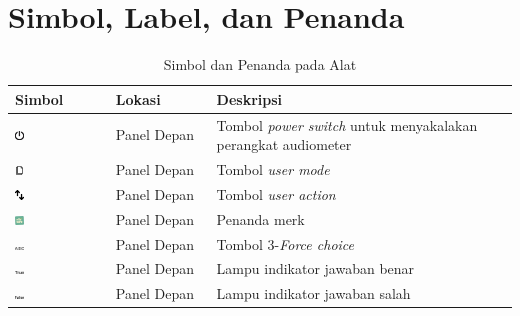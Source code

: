 \documentclass[11pt,a4paper,twoside,onecolumn]{book}
\begin{document}
		\section{Simbol, Label, dan Penanda}
		\begin{table}
			\centering
			\caption{Simbol dan Penanda pada Alat}
			\label{tab:2.2}
			\begin{tabular}{| p{0.2\linewidth} | p{0.2\linewidth}| p{0.6\linewidth}|}
				\hline
				Simbol & Lokasi & Deskripsi\\
				\hline
				\hline
				\includegraphics[width=0.1\textwidth]{images/powerswitch} & Panel Depan & Tombol \emph{power switch} untuk menyakalakan perangkat audiometer\\
				\hline
				\includegraphics[width=0.1\textwidth]{images/user-mode} & Panel Depan & Tombol \emph{user mode}\\
				\hline
				\includegraphics[width=0.1\textwidth]{images/user-action} & Panel Depan & Tombol \emph{user action}\\
				\hline
				\includegraphics[width=0.1\textwidth]{images/penanda-merk} & Panel Depan & Penanda merk\\
				\hline
				\includegraphics[width=0.1\textwidth]{images/3-forced-choice} & Panel Depan & Tombol 3-\emph{Force choice}\\
				\hline
				\includegraphics[width=0.1\textwidth]{images/true} & Panel Depan & Lampu indikator jawaban benar\\
				\hline
				\includegraphics[width=0.1\textwidth]{images/false} & Panel Depan & Lampu indikator jawaban salah\\

\end{tabular}
\end{table}
\end{document}
